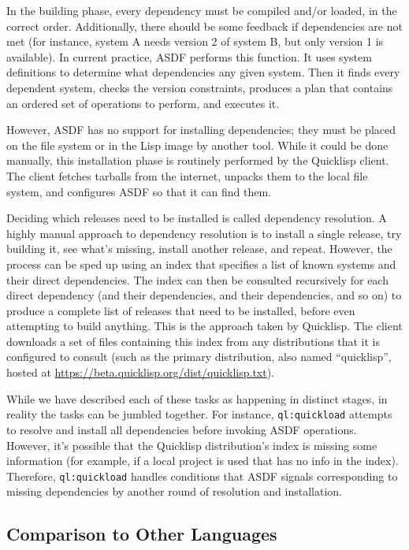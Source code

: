 \documentclass[format=sigconf]{acmart}
\begin{document}
In the building phase, every dependency must be compiled and/or loaded, in the
correct order. Additionally, there should be some feedback if dependencies are
not met (for instance, system A needs version 2 of system B, but only version 1
is available). In current practice, ASDF performs this function. It uses system
definitions to determine what dependencies any given system. Then it finds
every dependent system, checks the version constraints, produces a plan that
contains an ordered set of operations to perform, and executes it.

However, ASDF has no support for installing dependencies; they must be placed
on the file system or in the Lisp image by another tool. While it could be done
manually, this installation phase is routinely performed by the Quicklisp
client. The client fetches tarballs from the internet, unpacks them to the
local file system, and configures ASDF so that it can find them.

Deciding which releases need to be installed is called dependency resolution. A
highly manual approach to dependency resolution is to install a single release,
try building it, see what's missing, install another release, and
repeat. However, the process can be sped up using an index that specifies a
list of known systems and their direct dependencies. The index can then be
consulted recursively for each direct dependency (and their dependencies, and
their dependencies, and so on) to produce a complete list of releases that need
to be installed, before even attempting to build anything. This is the approach
taken by Quicklisp. The client downloads a set of files containing this index
from any distributions that it is configured to consult (such as the primary
distribution, also named ``quicklisp'', hosted at
\url{https://beta.quicklisp.org/dist/quicklisp.txt}).

While we have described each of these tasks as happening in distinct stages, in
reality the tasks can be jumbled together. For instance, \verb=ql:quickload=
attempts to resolve and install all dependencies before invoking ASDF
operations. However, it's possible that the Quicklisp distribution's index is
missing some information (for example, if a local project is used that has no
info in the index). Therefore, \verb=ql:quickload= handles conditions that ASDF
signals corresponding to missing dependencies by another round of resolution
and installation.

\subsection{Comparison to Other Languages}
\end{document}
